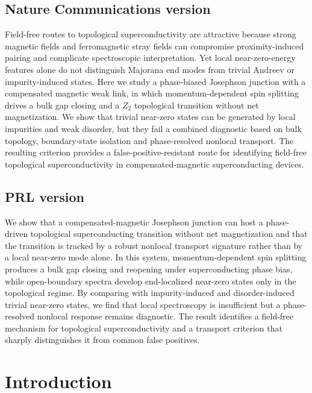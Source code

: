 \subsection*{Nature Communications version}
Field-free routes to topological superconductivity are attractive because strong magnetic fields and ferromagnetic stray fields can compromise proximity-induced pairing and complicate spectroscopic interpretation. Yet local near-zero-energy features alone do not distinguish Majorana end modes from trivial Andreev or impurity-induced states. Here we study a phase-biased Josephson junction with a compensated magnetic weak link, in which momentum-dependent spin splitting drives a bulk gap closing and a $Z_2$ topological transition without net magnetization. We show that trivial near-zero states can be generated by local impurities and weak disorder, but they fail a combined diagnostic based on bulk topology, boundary-state isolation and phase-resolved nonlocal transport. The resulting criterion provides a false-positive-resistant route for identifying field-free topological superconductivity in compensated-magnetic superconducting devices.

\subsection*{PRL version}
We show that a compensated-magnetic Josephson junction can host a phase-driven topological superconducting transition without net magnetization and that the transition is tracked by a robust nonlocal transport signature rather than by a local near-zero mode alone. In this system, momentum-dependent spin splitting produces a bulk gap closing and reopening under superconducting phase bias, while open-boundary spectra develop end-localized near-zero states only in the topological regime. By comparing with impurity-induced and disorder-induced trivial near-zero states, we find that local spectroscopy is insufficient but a phase-resolved nonlocal response remains diagnostic. The result identifies a field-free mechanism for topological superconductivity and a transport criterion that sharply distinguishes it from common false positives.

\section*{Introduction}

